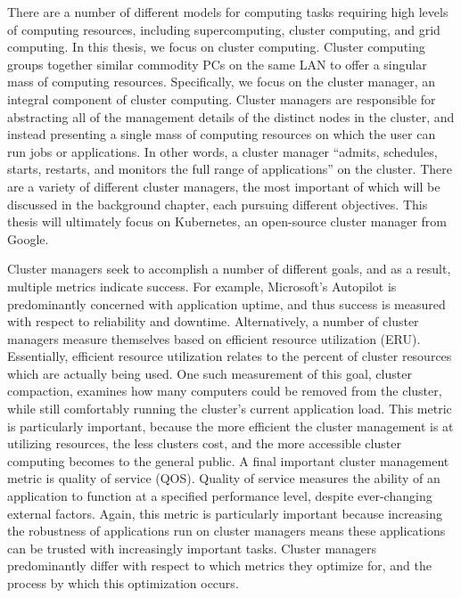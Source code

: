\documentclass[twoside]{report}
\begin{document}
There are a number of different models for computing tasks requiring high levels
of computing resources, including supercomputing, cluster computing, and grid
computing. In this thesis, we focus on cluster computing. Cluster computing
groups together similar commodity PCs on the same LAN to offer a singular mass
of computing resources. Specifically, we focus on the
cluster manager, an integral component of cluster computing. Cluster managers
are responsible for abstracting all of the management details of the distinct
nodes in the cluster, and instead presenting a single mass of computing resources
on which the user can run jobs or applications. In other words,
a cluster manager ``admits, schedules, starts, restarts, and monitors the full
range of applications'' on the cluster.\cite[pg. 1]{borg} There are a
variety of different cluster managers, the most important of which will be
discussed in the background chapter, each pursuing different objectives. This
thesis will ultimately focus on Kubernetes, an open-source cluster
manager from Google.\cite{k8s-website}

Cluster managers seek to accomplish a number of different goals, and as a
result, multiple metrics indicate success. For example, Microsoft's Autopilot is
predominantly concerned with application uptime, and thus success is measured
with respect to reliability and downtime.\cite[pg. 1]{autopilot}
Alternatively, a number of cluster managers measure themselves based on
efficient resource utilization (ERU).\cite[pg. 7]{borg} Essentially, efficient
resource utilization relates to the percent of cluster resources which are
actually being used. One such measurement of this goal, cluster
compaction, examines how many computers could be removed from the cluster, while
still comfortably running the cluster's current application load.\cite[pg.
5]{evaluating-job-packing-in-warehouse-scale-computing} This metric is
particularly important, because the more efficient the cluster management is at
utilizing resources, the less clusters cost, and the more accessible cluster
computing becomes to the general public. A final important
cluster management metric is quality of service (QOS). Quality of service measures the
ability of an application to function at a specified
performance level, despite ever-changing
external factors. Again, this metric is particularly important because
increasing the robustness of applications run on cluster managers means
these applications can be trusted with increasingly important tasks. Cluster
managers predominantly differ with respect to which metrics they optimize
for, and the process by which this optimization occurs.
\end{document}
